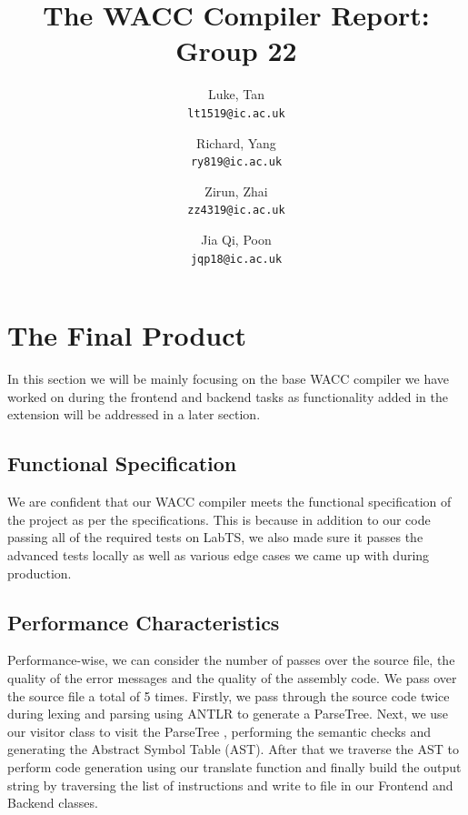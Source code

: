 \documentclass[11pt,a4paper]{article}
\begin{document}
\title{The WACC Compiler Report: Group 22}
\author{
Luke, Tan \\
\texttt{lt1519@ic.ac.uk}
\and
Richard, Yang \\
\texttt{ry819@ic.ac.uk}
\and
Zirun, Zhai \\
\texttt{zz4319@ic.ac.uk}
\and
Jia Qi, Poon\\
\texttt{jqp18@ic.ac.uk}
}

\maketitle

\section{The Final Product}
In this section we will be mainly focusing on the base WACC compiler we have worked on during the frontend and backend tasks as functionality added in the extension will be addressed in a later section. 

\subsection{Functional Specification}
We are confident that our WACC compiler meets the functional specification of the project as per the specifications. This is because in addition to our code passing all of the required tests on LabTS, we also made sure it passes the advanced tests locally as well as various edge cases we came up with during production. 

\subsection{Performance Characteristics}
Performance-wise, we can consider the number of passes over the source file, the quality of the error messages and the quality of the assembly code. We pass over the source file a total of 5 times. Firstly, we pass through the source code twice during lexing and parsing using ANTLR to generate a ParseTree. Next, we use our visitor class to visit the ParseTree , performing the semantic checks and generating the Abstract Symbol Table (AST). After that we traverse the AST to perform code generation using our translate function and finally build the output string by traversing the list of instructions and write to file in our Frontend and Backend classes.
\end{document}
